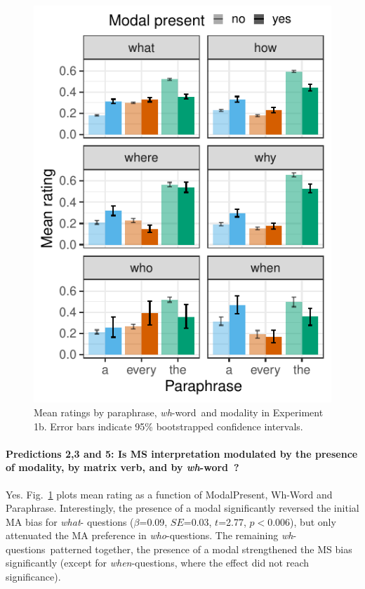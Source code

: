 \documentclass[12pt,letterpaper,table,svgnames,dvipsnames]{article}
\newcommand{\figref}[1]{Fig.~\ref{#1}}
\newcommand{\whqs}{\emph{wh}-questions~}
\newcommand{\whw}{\emph{wh}-word~}
\begin{document}
\begin{figure}[h!]
\centering
\includegraphics[scale=1]{figures/modxwh_eq_context.pdf}
\caption{Mean ratings by paraphrase, \whw and modality in Experiment 1b. Error bars indicate 95\% bootstrapped confidence intervals.} 
\label{ex1b_modXwh}
\end{figure}

\paragraph{Predictions 2,3 and 5: Is MS interpretation modulated by the presence of modality, by matrix verb, and by \whw?}
Yes. \figref{ex1b_modXwh} plots mean rating as a function of ModalPresent, Wh-Word and Paraphrase. Interestingly, the presence of a modal significantly reversed the initial MA bias for \emph{what}- questions ($\beta$=0.09, $SE$=0.03, $t$=2.77, $p<$0.006), but only attenuated the MA preference in \emph{who}-questions. The remaining \whqs patterned together, the presence of a modal strengthened the MS bias significantly (except for \emph{when}-questions, where the effect did not reach significance).
\end{document}
